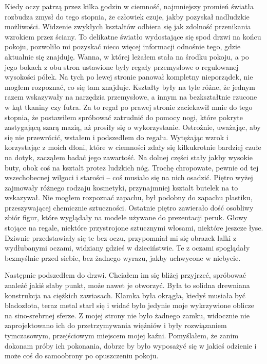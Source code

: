 Kiedy oczy patrzą przez kilka godzin w ciemność, najmniejszy promień światła rozbudza zmysł do tego stopnia, że człowiek czuje, jakby pozyskał nadludzkie możliwości. Widzenie zwykłych kształtów odbiera się jak zdolność przenikania wzrokiem przez ściany. To delikatne światło wydostające się spod drzwi na końcu pokoju, pozwoliło mi pozyskać nieco więcej informacji odnośnie tego, gdzie aktualnie się znajduję. Wanna, w której leżałem stała na środku pokoju, a po jego bokach z obu stron ustawione były regały przemysłowe o regulowanej wysokości półek. Na tych po lewej stronie panował kompletny nieporządek, nie mogłem rozpoznać, co się tam znajduje. Kształty były na tyle różne, że jednym razem wskazywały na narzędzia przemysłowe, a innym na bezkształtnie rzucone w kąt tkaniny czy futra. Za to regał po prawej stronie zaciekawił mnie do tego stopnia, że postawiłem spróbować zatrudnić do pomocy nogi, które pokryte zastygającą szarą mazią, aż prosiły się o wykorzystanie. Ostrożnie, uważając, aby się nie przewrócić, wstałem i podszedłem do regału. Wytężając wzrok i korzystając z moich dłoni, które w ciemności zdały się kilkukrotnie bardziej czułe na dotyk, zacząłem badać jego zawartość. Na dolnej części stały jakby wysokie buty, obok coś na kształt protez ludzkich nóg. Trochę chropowate, pewnie od tej wszechobecnej wilgoci i starości -- coś musiało się na nich osadzić. Piętro wyżej zajmowały różnego rodzaju kosmetyki, przynajmniej kształt butelek na to wskazywał. Nie mogłem rozpoznać zapachu, był podobny do zapachu plastiku, przeszywającej chemicznie sztuczności. Ostatnie piętro zawierało dość osobliwy zbiór figur, które wyglądały na modele używane do prezentacji peruk. Głowy stojące na regale, niektóre przystrojone sztucznymi włosami, niektóre jeszcze łyse. Dziwnie przedstawiały się te bez oczu, przypomniał mi się obrazek lalki z wydłubanymi oczami, widziany gdzieś w dzieciństwie. Te z oczami spoglądały bezmyślnie przed siebie, bez żadnego wyrazu, jakby uchwycone w niebycie. 

Następnie podszedłem do drzwi. Chciałem im się bliżej przyjrzeć, spróbować znaleźć jakiś słaby punkt, może nawet je otworzyć. Była to solidna drewniana konstrukcja na ciężkich zawiasach. Klamka była okrągła, kiedyś musiała być bladozłota, teraz metal starł się i widać było jedynie moje wykrzywione oblicze na sino-srebrnej sferze. Z mojej strony nie było żadnego zamku, widocznie nie zaprojektowano ich do przetrzymywania więźniów i były rozwiązaniem tymczasowym, przejściowym miejscem mojej kaźni. Pomyślałem, że zanim dokonam próby ich pokonania, dobrze by było wyposażyć się w jakieś odzienie i może coś do samoobrony po opuszczeniu pokoju.

